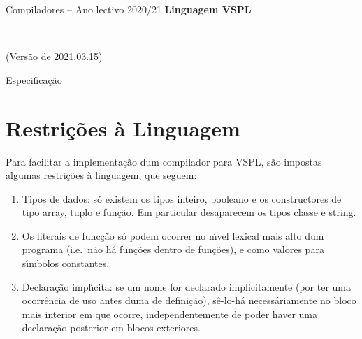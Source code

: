 \documentclass[a4paper]{article}
\begin{document}

\def\LANG{\textsf{VSPL}}

\begin{center}
  \begin{Large}
    \textsf{Compiladores -- Ano lectivo 2020/21}
    \textbf{Linguagem \LANG} \\
  \end{Large}
  \mbox{}\\
  \hrulefill{}
  \begin{center}
    (Versão de 2021.03.15)
  \end{center}
\end{center}

\noindent \hrulefill{} {\Large Especificação} \hrulefill{}

\let\tplsec\section
\let\tplsubsec\subsection


\tplsec{Restrições à Linguagem}

Para facilitar a implementação dum compilador para \LANG{}, são
impostas algumas restrições à linguagem, que seguem:
\begin{enumerate}
\item Tipos de dados: s\'o existem os tipos inteiro, booleano e os
  constructores de tipo array, tuplo e fun\c c\~ao.  Em particular
  desaparecem os tipos classe e string.
\item Os literais de func\c c\~ao s\'o podem ocorrer no n\'\i{}vel
  lexical mais alto dum programa (i.e.~n\~ao h\'a fun\c c\~oes dentro
  de fun\c c\~oes), e como valores para s\'\i{}mbolos constantes.
\item Declara\c c\~ao impl\'\i{}cita: se um nome for declarado
  implicitamente (por ter uma ocorr\^encia de uso antes duma de
  defini\c c\~ao), s\^e-lo-h\'a necess\'ariamente no bloco mais
  interior em que ocorre, independentemente de poder haver uma
  declara\c c\~ao posterior em blocos exteriores.
\end{enumerate}
\end{document}
